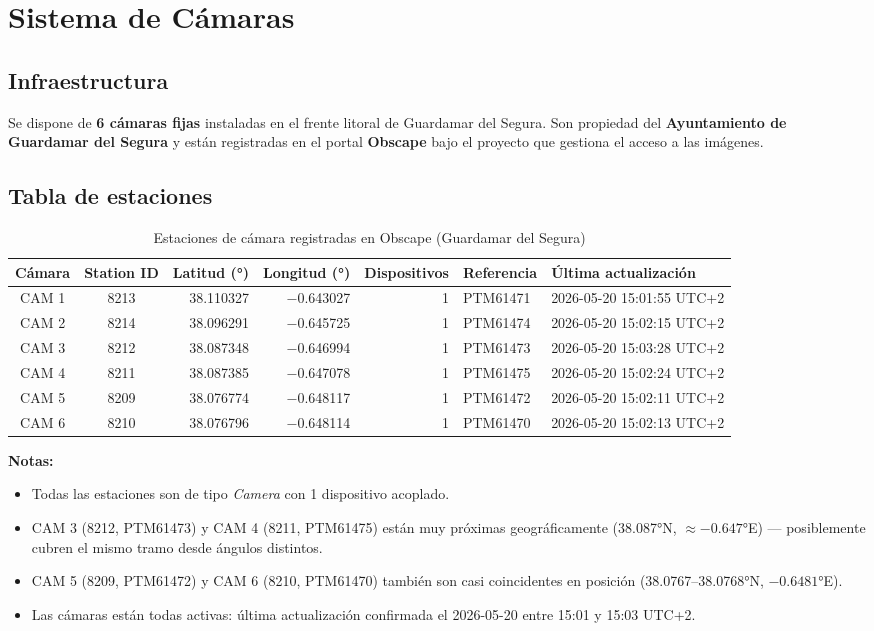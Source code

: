 \chapter{Sistema de Cámaras}

\section{Infraestructura}

Se dispone de \textbf{6 cámaras fijas} instaladas en el frente litoral de
Guardamar del Segura. Son propiedad del \textbf{Ayuntamiento de Guardamar del
Segura} y están registradas en el portal \textbf{Obscape} bajo el proyecto
que gestiona el acceso a las imágenes.

\section{Tabla de estaciones}

\begin{table}[h!]
\centering
\begin{tabular}{ccrrrll}
\toprule
\textbf{Cámara} & \textbf{Station ID} & \textbf{Latitud (°)} & \textbf{Longitud (°)} & \textbf{Dispositivos} & \textbf{Referencia} & \textbf{Última actualización} \\
\midrule
CAM 1 & 8213 & 38.110327 & $-$0.643027 & 1 & PTM61471 & 2026-05-20 15:01:55 UTC+2 \\
CAM 2 & 8214 & 38.096291 & $-$0.645725 & 1 & PTM61474 & 2026-05-20 15:02:15 UTC+2 \\
CAM 3 & 8212 & 38.087348 & $-$0.646994 & 1 & PTM61473 & 2026-05-20 15:03:28 UTC+2 \\
CAM 4 & 8211 & 38.087385 & $-$0.647078 & 1 & PTM61475 & 2026-05-20 15:02:24 UTC+2 \\
CAM 5 & 8209 & 38.076774 & $-$0.648117 & 1 & PTM61472 & 2026-05-20 15:02:11 UTC+2 \\
CAM 6 & 8210 & 38.076796 & $-$0.648114 & 1 & PTM61470 & 2026-05-20 15:02:13 UTC+2 \\
\bottomrule
\end{tabular}
\caption{Estaciones de cámara registradas en Obscape (Guardamar del Segura)}
\end{table}

\textbf{Notas:}
\begin{itemize}
  \item Todas las estaciones son de tipo \emph{Camera} con 1 dispositivo acoplado.
  \item CAM 3 (8212, PTM61473) y CAM 4 (8211, PTM61475) están muy próximas
        geográficamente (38.087°N, $\approx -0.647°$E) — posiblemente cubren
        el mismo tramo desde ángulos distintos.
  \item CAM 5 (8209, PTM61472) y CAM 6 (8210, PTM61470) también son casi
        coincidentes en posición (38.0767--38.0768°N, $-0.6481°$E).
  \item Las cámaras están todas activas: última actualización confirmada
        el 2026-05-20 entre 15:01 y 15:03 UTC+2.
\end{itemize}

